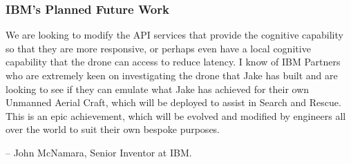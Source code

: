 \documentclass{article}
\begin{document}
\subsubsection{IBM's Planned Future Work}\label{JonFuture}
\begin{itshape}
We are looking to modify the API services that provide the cognitive capability so that they are more responsive, or perhaps even have a local cognitive capability that the drone can access to reduce latency. I know of IBM Partners who are extremely keen on investigating the drone that Jake has built and are looking to see if they can emulate what Jake has achieved for their own Unmanned Aerial Craft, which will be deployed to assist in Search and Rescue. This is an epic achievement, which will be evolved and modified by engineers all over the world to suit their own bespoke purposes.\end{itshape} -- John McNamara, Senior Inventor at IBM.





\printbibliography[title={Bibliography}]
\end{document}
